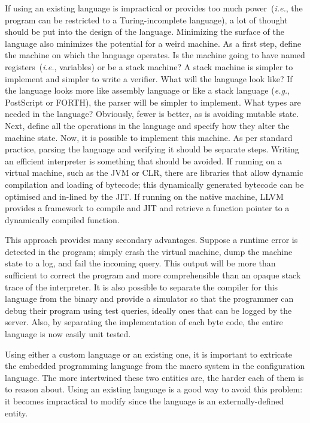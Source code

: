 \documentclass[letterpaper,twocolumn,10pt]{article}
\begin{document}
If using an existing language is impractical or provides too much power~(\emph{i.e.}, the program can be restricted to a Turing-incomplete language), a lot of thought should be put into the design of the language. Minimizing the surface of the language also minimizes the potential for a weird machine. As a first step, define the machine on which the language operates. Is the machine going to have named registers~(\emph{i.e.}, variables) or be a stack machine? A stack machine is simpler to implement and simpler to write a verifier. What will the language look like? If the language looks more like assembly language or like a stack language (\emph{e.g.}, PostScript or FORTH), the parser will be simpler to implement. What types are needed in the language? Obviously, fewer is better, as is avoiding mutable state. Next, define all the operations in the language and specify how they alter the machine state. Now, it is possible to implement this machine. As per standard practice, parsing the language and verifying it should be separate steps. Writing an efficient interpreter is something that should be avoided. If running on a virtual machine, such as the JVM or CLR, there are libraries that allow dynamic compilation and loading of bytecode; this dynamically generated bytecode can be optimised and in-lined by the JIT. If running on the native machine, LLVM provides a framework to compile and JIT and retrieve a function pointer to a dynamically compiled function.

This approach provides many secondary advantages. Suppose a runtime error is detected in the program; simply crash the virtual machine, dump the machine state to a log, and fail the incoming query. This output will be more than sufficient to correct the program and more comprehensible than an opaque stack trace of the interpreter. It is also possible to separate the compiler for this language from the binary and provide a simulator so that the programmer can debug their program using test queries, ideally ones that can be logged by the server. Also, by separating the implementation of each byte code, the entire language is now easily unit tested.

Using either a custom language or an existing one, it is important to extricate the embedded programming language from the macro system in the configuration language. The more intertwined these two entities are, the harder each of them is to reason about. Using an existing language is a good way to avoid this problem: it becomes impractical to modify since the language is an externally-defined entity.
\end{document}
